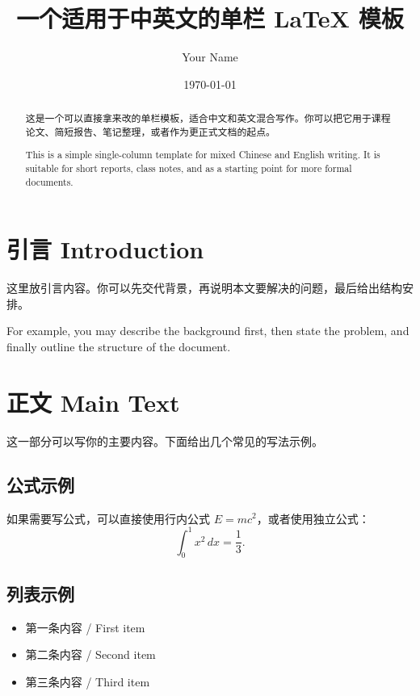 \documentclass[11pt,a4paper,UTF8]{ctexart}
\title{一个适用于中英文的单栏 LaTeX 模板}
\author{Your Name}
\date{\today}
\begin{document}
\maketitle

\begin{abstract}
这是一个可以直接拿来改的单栏模板，适合中文和英文混合写作。你可以把它用于课程论文、简短报告、笔记整理，或者作为更正式文档的起点。

This is a simple single-column template for mixed Chinese and English writing. It is suitable for short reports, class notes, and as a starting point for more formal documents.
\end{abstract}

\tableofcontents
\newpage

\section{引言 Introduction}
这里放引言内容。你可以先交代背景，再说明本文要解决的问题，最后给出结构安排。

For example, you may describe the background first, then state the problem, and finally outline the structure of the document.

\section{正文 Main Text}
这一部分可以写你的主要内容。下面给出几个常见的写法示例。

\subsection{公式示例}
如果需要写公式，可以直接使用行内公式 $E=mc^2$，或者使用独立公式：
\begin{equation}
  \int_0^1 x^2 \, dx = \frac{1}{3}.
\end{equation}

\subsection{列表示例}
\begin{itemize}[leftmargin=2em]
  \item 第一条内容 / First item
  \item 第二条内容 / Second item
  \item 第三条内容 / Third item
\end{itemize}
\end{document}
